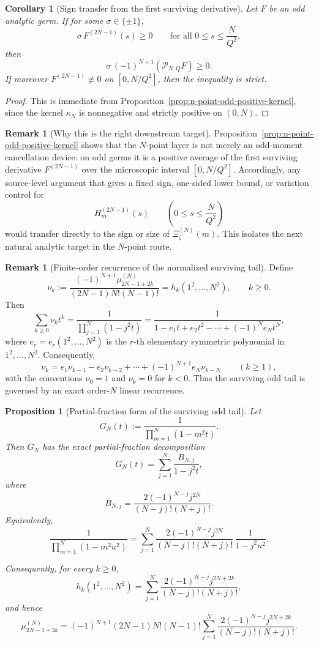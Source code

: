 \documentclass[11pt,a4paper]{amsart}
\theoremstyle{plain}
\newtheorem{proposition}[theorem]{Proposition}
\newtheorem{corollary}[theorem]{Corollary}
\theoremstyle{definition}
\newtheorem{remark}[theorem]{Remark}
\begin{document}
\begin{corollary}[Sign transfer from the first surviving derivative]
\label{cor:n-point-sign-transfer}
Let $F$ be an odd analytic germ. If for some $\sigma\in\{\pm1\}$,
\[
\sigma\,F^{(2N-1)}(s)\ge 0
\qquad
\text{for all } 0\le s\le \frac{N}{Q^2},
\]
then
\[
\sigma\,(-1)^{N+1}(\mathcal P_{N,Q}F)\ge 0.
\]
If moreover $F^{(2N-1)}\not\equiv 0$ on $[0,N/Q^2]$, then the inequality
is strict.
\end{corollary}

\begin{proof}
This is immediate from Proposition~\ref{prop:n-point-odd-positive-kernel},
since the kernel $\kappa_N$ is nonnegative and strictly positive on
$(0,N)$.
\end{proof}

\begin{remark}[Why this is the right downstream target]
\label{rem:n-point-positive-kernel-target}
Proposition~\ref{prop:n-point-odd-positive-kernel} shows that the $N$-point
layer is not merely an odd-moment cancellation device: on odd germs it is a
positive average of the first surviving derivative
$F^{(2N-1)}$ over the microscopic interval $[0,N/Q^2]$. Accordingly, any
source-level argument that gives a fixed sign, one-sided lower bound, or
variation control for
\[
H_m^{(2N-1)}(s)
\qquad
\left(0\le s\le \frac{N}{Q^2}\right)
\]
would transfer directly to the sign or size of $\Xi_\zeta^{(N)}(m)$.
This isolates the next natural analytic target in the $N$-point route.
\end{remark}

\begin{remark}[Finite-order recurrence of the normalized surviving tail]
\label{rem:n-point-tail-recurrence}
Define
\[
\nu_k
:=
\frac{(-1)^{N+1}\mu_{2N-1+2k}^{(N)}}{(2N-1)N!(N-1)!}
=
h_k(1^2,\dots,N^2),
\qquad k\ge 0.
\]
Then
\[
\sum_{k\ge 0}\nu_k t^k
=
\frac{1}{\prod_{j=1}^N(1-j^2t)}
=
\frac{1}{1-e_1 t+e_2 t^2-\cdots+(-1)^N e_N t^N},
\]
where $e_r=e_r(1^2,\dots,N^2)$ is the $r$-th elementary symmetric
polynomial in $1^2,\dots,N^2$. Consequently,
\[
\nu_k
=
e_1\nu_{k-1}-e_2\nu_{k-2}+\cdots+(-1)^{N+1}e_N\nu_{k-N}
\qquad (k\ge 1),
\]
with the conventions $\nu_0=1$ and $\nu_{k}=0$ for $k<0$. Thus the
surviving odd tail is governed by an exact order-$N$ linear recurrence.
\end{remark}

\begin{proposition}[Partial-fraction form of the surviving odd tail]
\label{prop:n-point-tail-partial-fractions}
Let
\[
G_N(t):=\frac{1}{\prod_{m=1}^N(1-m^2 t)}.
\]
Then $G_N$ has the exact partial-fraction decomposition
\[
G_N(t)
=
\sum_{j=1}^N \frac{B_{N,j}}{1-j^2 t},
\]
where
\[
B_{N,j}
=
\frac{2(-1)^{N-j}j^{2N}}{(N-j)!(N+j)!}.
\]
Equivalently,
\[
\frac{1}{\prod_{m=1}^N(1-m^2u^2)}
=
\sum_{j=1}^N
\frac{2(-1)^{N-j}j^{2N}}{(N-j)!(N+j)!}\,
\frac{1}{1-j^2u^2}.
\]

Consequently, for every $k\ge 0$,
\[
h_k(1^2,\dots,N^2)
=
\sum_{j=1}^N
\frac{2(-1)^{N-j}j^{2N+2k}}{(N-j)!(N+j)!},
\]
and hence
\[
\mu_{2N-1+2k}^{(N)}
=
(-1)^{N+1}(2N-1)N!(N-1)!
\sum_{j=1}^N
\frac{2(-1)^{N-j}j^{2N+2k}}{(N-j)!(N+j)!}.
\]
\end{proposition}
\end{document}
